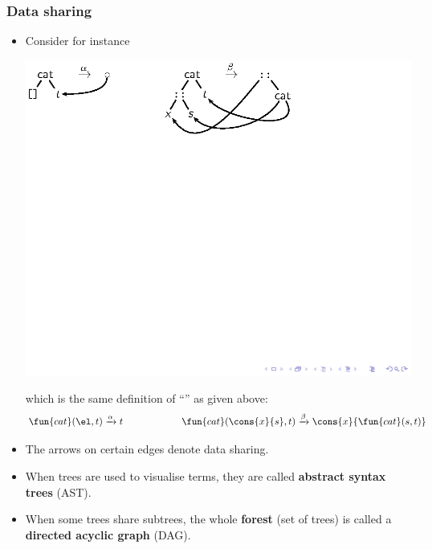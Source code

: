 \documentclass[compress,dvips,xcolor={dvipsnames},t]{beamer}
\begin{document}
\begin{frame}
  \frametitle{Data sharing}

  \begin{itemize}

    \item Consider for instance
      \begin{center}
        \centering
        \includegraphics[bb=25 725 265 793]{cat_dag}
      \end{center}
      which is the same definition of ``'' as given above:
      \begin{equation*}
        \fun{cat}(\el,t) \xrightarrow{\alpha} t
        \qquad\qquad\qquad
        \fun{cat}(\cons{x}{s},t) \xrightarrow{\beta}
        \cons{x}{\fun{cat}(s,t)}
      \end{equation*}

    \item The arrows on certain edges denote data sharing.

    \item When trees are used to visualise terms, they are called
      \textbf{abstract syntax trees} (AST).

    \item When some trees share subtrees, the whole \textbf{forest}
      (set of trees) is called a \textbf{directed acyclic graph}
      (DAG).

  \end{itemize}

\end{frame}
\end{document}
